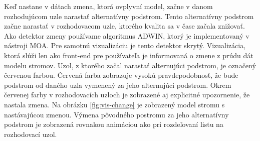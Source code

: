 \label{fig:vis-hb-color}
\par
Keď nastane v dátach zmena, ktorá ovplyvní model, začne v danom rozhodujúcom uzle narastať alternatívny podstrom. Tento alternatívny podstrom začne narastať v rozhodovacom uzle, ktorého kvalita sa v čase začala znižovať. Ako detektor zmeny používame algoritmus ADWIN, ktorý je implementovaný v nástroji MOA. Pre samotnú vizualizáciu je tento detektor skrytý. Vizualizácia, ktorá slúži len ako front-end pre používateľa je informovaná o zmene z prúdu dát modelu stromov. Uzol, z ktorého začal narastať alternujúci podstrom, je označený červenou farbou. Červená farba zobrazuje vysokú pravdepodobnosť, že bude podstrom od daného uzla vymenený za jeho alternujúci podstrom. Okrem červenej farby v rozhodovacích uzloch je zobrazené aj explicitné upozornenie, že nastala zmena. Na obrázku \ref{fig:vis-change} je zobrazený model stromu s nastávajúcou zmenou. Výmena pôvodného postromu za jeho alternatívny podstrom je zobrazená rovnakou animáciou ako pri rozdeľovaní listu na rozhodovací uzol.
\label{fig:vis-change}

